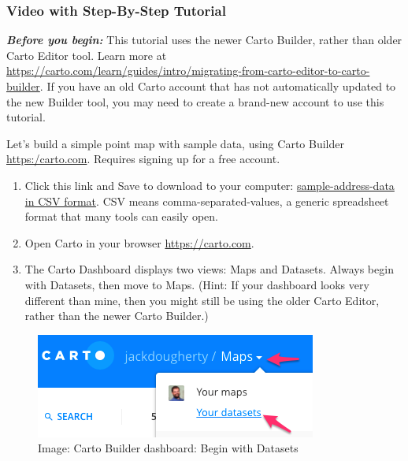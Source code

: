 \documentclass[
  english,
]{book}
\begin{document}
\hypertarget{video-with-step-by-step-tutorial-4}{%
\subsubsection*{Video with Step-By-Step Tutorial}\label{video-with-step-by-step-tutorial-4}}

\textbf{\emph{Before you begin:}} This tutorial uses the newer Carto Builder, rather than older Carto Editor tool. Learn more at \url{https://carto.com/learn/guides/intro/migrating-from-carto-editor-to-carto-builder}. If you have an old Carto account that has not automatically updated to the new Builder tool, you may need to create a brand-new account to use this tutorial.

Let's build a simple point map with sample data, using Carto Builder \url{https:/carto.com}. Requires signing up for a free account.

\begin{enumerate}
\def\labelenumi{\arabic{enumi})}
\item
  Click this link and Save to download to your computer: \href{data/sample-address-data.csv}{sample-address-data in CSV format}. CSV means comma-separated-values, a generic spreadsheet format that many tools can easily open.
\item
  Open Carto in your browser \url{https://carto.com}.
\item
  The Carto Dashboard displays two views: Maps and Datasets. Always begin with Datasets, then move to Maps. (Hint: If your dashboard looks very different than mine, then you might still be using the older Carto Editor, rather than the newer Carto Builder.)
\end{enumerate}

\begin{figure}
\centering
\includegraphics{images/06-map/carto-dashboard-maps-datasets.png}
\caption{Image: Carto Builder dashboard: Begin with Datasets}
\end{figure}
\end{document}
